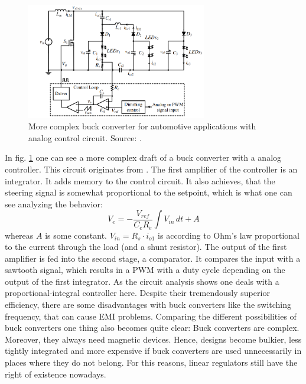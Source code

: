 \begin{figure}[H]                                                         
\centering          
\includegraphics[width=0.7\textwidth]{./fig/buck2}   
\caption[More complex buck converter for automotive applications with analog control circuit.]{More complex buck converter for automotive applications with analog control circuit. Source: \cite{article:buck2}.}   
\label{fig:buck2}                                                       
\end{figure}  

In fig. \ref{fig:buck2} one can see a more complex draft of a buck converter with a analog controller. This circuit originates from \cite{article:buck2}. The first amplifier of the controller is an integrator. It adds memory to the control circuit. It also achieves, that the steering signal is somewhat proportional to the setpoint, which is what one can see analyzing the behavior: 
\begin{equation}
	V_e = - \frac{V_{ref}}{C_e R_e} \int V_{in} \, dt + A 
\end{equation}
whereas \ensuremath{A} is some constant. \ensuremath{V_{in} = R_s \cdot i_{o1}} is according to Ohm's law proportional to the current through the load (and a shunt resistor). The output of the first amplifier is fed into the second stage, a comparator. It compares the input with a sawtooth signal, which results in a \gls{PWM} with a duty cycle depending on the output of the first integrator. As the circuit analysis shows one deals with a proportional-integral controller here.   
\newpar 
Despite their tremendously superior efficiency, there are some disadvantages with buck converters like the switching frequency, that can cause \gls{EMI} problems. Comparing the different possibilities of buck converters one thing also becomes quite clear: Buck converters are complex. Moreover, they always need magnetic devices. Hence, designs become bulkier, less tightly integrated and more expensive if buck converters are used unnecessarily in places where they do not belong. For this reasons, linear regulators still have the right of existence nowadays. 

